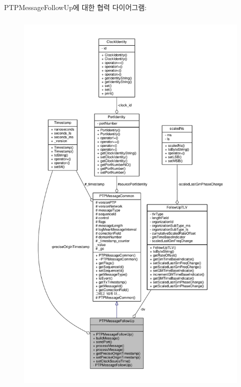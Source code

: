P\+T\+P\+Message\+Follow\+Up에 대한 협력 다이어그램\+:
\nopagebreak
\begin{figure}[H]
\begin{center}
\leavevmode
\includegraphics[height=550pt]{class_p_t_p_message_follow_up__coll__graph}
\end{center}
\end{figure}
